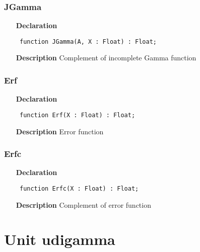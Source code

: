 \documentclass[12pt,a4paper,oneside]{report}
\newcommand{\declarationitem}[1]{\textbf{#1}}
\newcommand{\descriptiontitle}[1]{\textbf{#1}}
\newcommand{\code}[1]{\texttt{#1}}
\begin{document}
\subsubsection{JGamma}
\label{uigamma-JGamma}
\begin{itemize}\item[\declarationitem{Declaration}\hfill]
	\begin{flushleft}
		\code{
			function JGamma(A, X : Float) : Float;}
		
	\end{flushleft}
	
	\par
	\item[\descriptiontitle{Description}]
	Complement of incomplete Gamma function
	
\end{itemize}
\subsubsection{Erf}
\label{uigamma-Erf}
\begin{itemize}\item[\declarationitem{Declaration}\hfill]
	\begin{flushleft}
		\code{
			function Erf(X : Float) : Float;}
		
	\end{flushleft}
	
	\par
	\item[\descriptiontitle{Description}]
	Error function
	
\end{itemize}
\subsubsection{Erfc}
\label{uigamma-Erfc}
\begin{itemize}\item[\declarationitem{Declaration}\hfill]
	\begin{flushleft}
		\code{
			function Erfc(X : Float) : Float;}
		
	\end{flushleft}
	
	\par
	\item[\descriptiontitle{Description}]
	Complement of error function
	
\end{itemize}
\section{Unit udigamma}
\label{udigamma}
\end{document}

